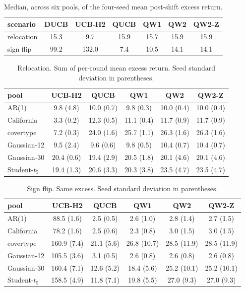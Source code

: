 \begin{table}[ht]
\centering
\caption{Median, across six pools, of the four-seed mean post-shift excess return.}
\begin{tabular}{lcccccc}
\toprule
scenario & DUCB & UCB-H2 & QUCB & QW1 & QW2 & QW2-Z \\
\midrule
relocation & 15.3 & 9.7 & 15.9 & 15.7 & 15.9 & 15.9 \\
sign flip & 99.2 & 132.0 & 7.4 & 10.5 & 14.1 & 14.1 \\
\bottomrule
\end{tabular}
\end{table}

\begin{table}[ht]
\centering
\caption{Relocation. Sum of per-round mean excess return. Seed standard deviation in parentheses.}
\begin{tabular}{lccccc}
\toprule
pool & UCB-H2 & QUCB & QW1 & QW2 & QW2-Z \\
\midrule
AR(1) & 9.8 (4.8) & 10.0 (0.7) & 9.8 (0.3) & 10.0 (0.4) & 10.0 (0.4) \\
California & 3.3 (0.2) & 12.3 (0.5) & 11.1 (0.4) & 11.7 (0.9) & 11.7 (0.9) \\
covertype & 7.2 (0.3) & 24.0 (1.6) & 25.7 (1.1) & 26.3 (1.6) & 26.3 (1.6) \\
Gaussian-12 & 9.5 (2.4) & 9.6 (0.6) & 9.8 (0.5) & 10.4 (0.7) & 10.4 (0.7) \\
Gaussian-30 & 20.4 (0.6) & 19.4 (2.9) & 20.5 (1.8) & 20.1 (4.6) & 20.1 (4.6) \\
Student-$t_5$ & 19.4 (1.3) & 20.6 (3.3) & 20.3 (3.8) & 23.5 (4.7) & 23.5 (4.7) \\
\bottomrule
\end{tabular}
\end{table}

\begin{table}[ht]
\centering
\caption{Sign flip. Same excess. Seed standard deviation in parentheses.}
\begin{tabular}{lccccc}
\toprule
pool & UCB-H2 & QUCB & QW1 & QW2 & QW2-Z \\
\midrule
AR(1) & 88.5 (1.6) & 2.5 (0.5) & 2.6 (1.0) & 2.8 (1.4) & 2.7 (1.5) \\
California & 78.2 (1.6) & 2.5 (0.6) & 2.3 (0.8) & 3.0 (1.5) & 3.0 (1.5) \\
covertype & 160.9 (7.4) & 21.1 (5.6) & 26.8 (10.7) & 28.5 (11.9) & 28.5 (11.9) \\
Gaussian-12 & 105.5 (3.6) & 3.1 (0.5) & 2.6 (0.8) & 2.6 (0.8) & 2.6 (0.8) \\
Gaussian-30 & 160.4 (7.1) & 12.6 (5.2) & 18.4 (5.6) & 25.2 (10.1) & 25.2 (10.1) \\
Student-$t_5$ & 158.5 (4.9) & 11.8 (7.1) & 19.8 (5.5) & 27.0 (9.3) & 27.0 (9.3) \\
\bottomrule
\end{tabular}
\end{table}
